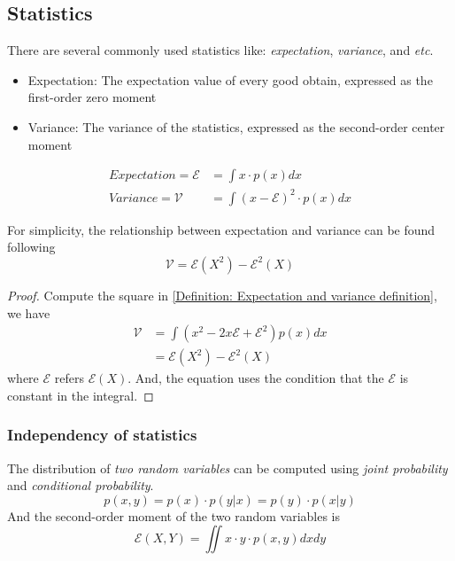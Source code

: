 \documentclass[../main.tex]{subfiles}
\begin{document}
\subsection{Statistics}
There are several commonly used statistics like: \emph{expectation}, \emph{variance}, and \textit{etc}.
\begin{itemize}
    \item Expectation: The expectation value of every good obtain, expressed as the first-order zero moment
    \item Variance: The variance of the statistics, expressed as the second-order center moment
\end{itemize}
\begin{equation}
    \label{Definition: Expectation and variance definition}
    \begin{split}
        Expectation = \mathcal{E} & = \int x \cdot p(x) dx                 \\
        Variance = \mathcal{V}    & = \int (x-\mathcal{E})^2 \cdot p(x) dx
    \end{split}
\end{equation}
\begin{lemma}
    \label{Lemma: Relationship between expectation and variance}
    For simplicity, the relationship between expectation and variance can be found following
    \begin{equation*}
        \mathcal{V} = \mathcal{E}(X^2) - \mathcal{E}^2(X)
    \end{equation*}
    \begin{proof}
        Compute the square in \eqref{Definition: Expectation and variance definition},
        we have
        \begin{align*}
            \mathcal{V} & = \int (x^2 - 2 x \mathcal{E} + \mathcal{E}^2) p(x) dx \\
                        & = \mathcal{E}(X^2) - \mathcal{E}^2(X)
        \end{align*}
        where $\mathcal{E}$ refers $\mathcal{E}(X)$.
        And, the equation uses the condition that the $\mathcal{E}$ is constant in the integral.
    \end{proof}
\end{lemma}

\subsubsection{Independency of statistics}
The distribution of \emph{two random variables} can be computed using \emph{joint probability} and \emph{conditional probability}.
\begin{equation*}
    p(x, y) = p(x) \cdot p(y|x) = p(y) \cdot p(x|y)
\end{equation*}
And the second-order moment of the two random variables is
\begin{equation*}
    \mathcal{E}(X, Y) = \iint x \cdot y \cdot p(x, y) dx dy
\end{equation*}
\end{document}
